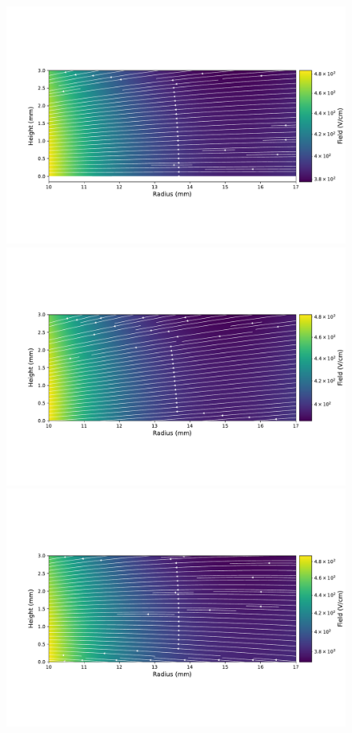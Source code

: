 \begin{figure}
\centering
\includegraphics[trim={1.5cm 3.5cm 0.2cm 4.6cm},clip,width=0.95\linewidth]{ch3/figs/elect_field_lines_surface_ponama_1_sc_0.pdf}
\includegraphics[trim={1.5cm 3.5cm 0.2cm 4.6cm},clip,width=0.95\linewidth]{ch3/figs/elect_field_lines_surface_ponama_1_sc_-0.5.pdf}
\includegraphics[trim={1.5cm 3.5cm 0.2cm 4.6cm},clip,width=0.95\linewidth]{ch3/figs/elect_field_lines_surface_ponama_1_sc_0.5.pdf}

\end{figure}
